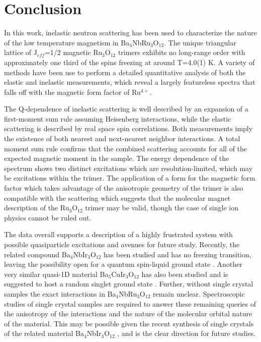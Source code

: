 \documentclass[%
 reprint,
superscriptaddress,
 amsmath,amssymb,
 aps,
 prb,
]{revtex4-2}
\begin{document}
\section{Conclusion}

In this work, inelastic neutron scattering has been used to characterize the nature of the low temperature magnetism in Ba$_4$NbRu$_3$O$_{12}$. The unique triangular lattice of J$_{eff}$=1/2 magnetic Ru$_3$O$_{12}$ trimers exhibits no long-range order with approximately one third of the spins freezing at around T=4.0(1) K. A variety of methods have been use to perform a detailed quantitative analysis of both the elastic and inelastic measurements, which reveal a largely featureless spectra that falls off with the magnetic form factor of Ru$^{4+}$. 

The Q-dependence of inelastic scattering is well described by an expansion of a first-moment sum rule assuming Heisenberg interactions, while the elastic scattering is described by real space spin correlations. Both measurements imply the existence of both nearest and next-nearest neighbor interactions. A total moment sum rule confirms that the combined scattering accounts for all of the expected magnetic moment in the sample. The energy dependence of the spectrum shows two distinct excitations which are resolution-limited, which may be excitations within the trimer. The application of a form for the magnetic form factor which takes advantage of the anisotropic geometry of the trimer is also compatible with the scattering which suggests that the molecular magnet description of the Ru$_3$O$_{12}$ trimer may be valid, though the case of single ion physics cannot be ruled out.

The data overall supports a description of a highly frustrated system with possible quasiparticle excitations and avenues for future study. Recently, the related compound Ba$_4$NbIr$_3$O$_{12}$ has been studied and has no freezing transition, leaving the possibility open for a quantum spin-liquid ground state \cite{Nguyen2019Trimer-basedBa4NbIr3O12}. Another very similar quasi-1D material Ba$_5$CuIr$_3$O$_{12}$ has also been studied and is suggested to host a random singlet ground  state \cite{Volkov2020RandomCrystals}. Further, without single crystal samples the exact interactions in Ba$_4$NbRu$_3$O$_{12}$ remain unclear. Spectroscopic studies of single crystal samples are required to answer these remaining queries of the anisotropy of the interactions and the nature of the molecular orbital nature of the material. This may be possible given the recent synthesis of single crystals of the related material Ba$_4$NbIr$_3$O$_{12}$ \cite{Thakur2020CrystalMaterial}, and is the clear direction for future studies. 
\end{document}
